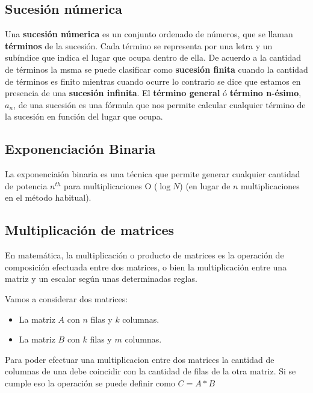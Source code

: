 \subsection{Sucesión númerica}
Una \textbf{sucesión númerica} es un conjunto ordenado de números, que se llaman \textbf{términos} de la sucesión. Cada término se representa por una letra y un subíndice que indica el lugar que ocupa dentro de ella. De acuerdo a la cantidad de términos la msma se puede clasificar como \textbf{sucesión finita} cuando la cantidad de términos es finito mientras cuando ocurre lo contrario se dice que estamos en presencia de una \textbf{sucesión infinita}. El \textbf{término general} ó \textbf{término n-ésimo}, $a_{n}$, de una sucesión es una fórmula que nos permite calcular cualquier término de la sucesión en función del lugar que ocupa.

\subsection{Exponenciación Binaria}
La exponenciaión binaria es una técnica que permite generar cualquier cantidad de potencia $n^{th}$ para multiplicaciones O ($\log N$) (en lugar de $n$ multiplicaciones en el método habitual).


\subsection{Multiplicación de matrices}
En matemática, la multiplicación o producto de matrices es la operación de composición efectuada entre dos matrices, o bien la multiplicación entre una matriz y un escalar según unas determinadas reglas.

Vamos a considerar dos matrices:

\begin{itemize}
	\item La matriz $A$ con $n$ filas y $k$ columnas.
	\item La matriz $B$ con $k$ filas y $m$ columnas.
\end{itemize}

Para poder efectuar una multiplicacion entre dos matrices la cantidad de columnas de una debe coincidir con la cantidad de filas de la otra matriz. Si se cumple eso la operación se puede definir como $C=A*B$ 
\vspace*{0.3in}

